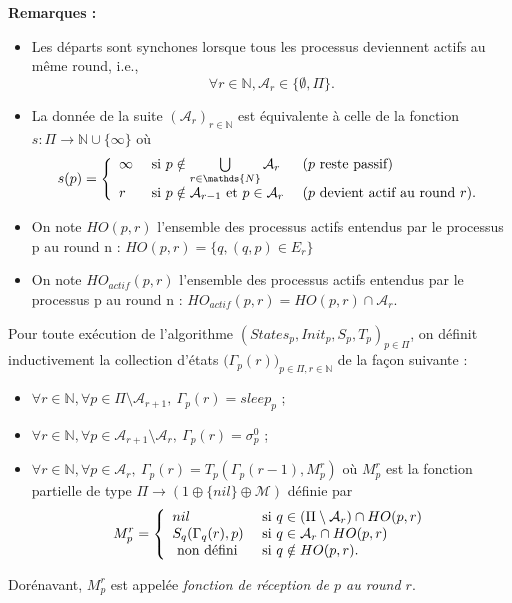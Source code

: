 \documentclass{article}
\begin{document}
\textbf{Remarques :}
\begin{itemize}
	\item Les départs sont synchones lorsque tous les processus deviennent actifs au même round, i.e.,
	$$ \forall r \in \mathds{N}, \mathcal{A}_r \in \{\emptyset, \Pi\}  . $$
	\item La donn\'ee de la suite $(\mathcal{A}_r)_{r \in \mathds{N}}$ est  équivalente \`a celle de la fonction 
	$s : \Pi \rightarrow \mathds{N} \cup \{\infty\}$ où 
	$$ s(p) = \left \{ \begin{array}{l ll}
	                          \infty & \mbox{ si  } p \notin \bigcup\limits_{r \in \mathds{N}}  \mathcal{A}_r &  \mbox { ($p$ reste passif) } \\
	                          r  & \mbox{ si  } p \notin \mathcal{A}_{r-1} \mbox{ et } p \in \mathcal{A}_{r}  & \mbox{ ($p$ devient actif au round $r$)}.
	                          \end{array} \right.$$ 
	\item On note $HO(p,r)$ l'ensemble des processus actifs entendus par le processus p au round n : $HO(p,r) = \{q, (q,p) \in E_r\}$
	\item On note $HO_{actif}(p,r)$ l'ensemble des processus actifs entendus par le processus p au round n : $HO_{actif}(p,r) = HO(p,r) \cap \mathcal{A}_r$.

\end{itemize}

Pour toute  exécution de l'algorithme  $(States_p, Init_p, S_p,T_p)_{p\in \Pi}$, on définit inductivement la collection 
	d'\'etats $ \big( \Gamma_p(r) \big )_{p\in\Pi, r\in \mathds{N}}$ de la fa\c{c}on suivante : 
	\begin{itemize}
		\item $\forall r \in \mathds{N},\forall p \in \Pi \setminus \mathcal{A}_{r+1}, \  \Gamma_p(r) = sleep_p$ ;
		\item $\forall r  \in \mathds{N},\forall p \in \mathcal{A}_{r+1} \setminus \mathcal{A}_r, \ \Gamma_p(r) = \sigma^0_p$ ;
		\item $\forall r  \in \mathds{N},\forall p \in \mathcal{A}_{r} , \  \Gamma_p(r) = T_p (\Gamma_p(r - 1) ,M_p^{r})$
			où $M_p^r$ est la fonction partielle de type $\Pi \rightarrow (1 \oplus \{ nil \} \oplus \mathcal{M})$ définie par 
			$$ M_p^r = \left \{ \begin{array}{l l}
	                         nil  & \mbox{ si  } q \in (\Pi \setminus \mathcal{A}_r  ) \cap  HO(p,r)  \\
	                         S_q (\Gamma_q(r), p)  & \mbox{ si  }   q \in \mathcal{A}_r  \cap  HO(p,r) \\
	                         \mbox{ non d\'efini  } & \mbox{ si  }   q \notin  HO(p,r) .
	                          \end{array} \right.$$ 
	\end{itemize}
Dorénavant, $M_p^r$ est appelée \emph{fonction de réception de $p$ au round $r$}.
\end{document}
